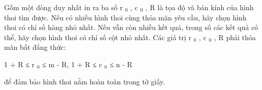 Gồm một dòng duy nhất in ra ba số r   $_    0   $   , c   $_    0   $   , R là tọa độ và bán kính của hình thoi tìm được. Nếu có nhiều hình thoi cùng thỏa mãn yêu cầu, hãy chọn hình thoi có chỉ số hàng nhỏ nhất. Nếu vẫn còn nhiều kết quả, trong số các kết quả có thể, hãy chọn hình thoi có chỉ số cột nhỏ nhất. Các giá trị r   $_    0   $   , c   $_    0   $   , R phải thỏa mãn bất đẳng thức:  

   1 + R ≤ r   $_    0   $   ≤ m - R, 1 + R ≤ c   $_    0   $   ≤ n - R  

   để đảm bảo hình thoi nằm hoàn toàn trong tờ giấy.  

\